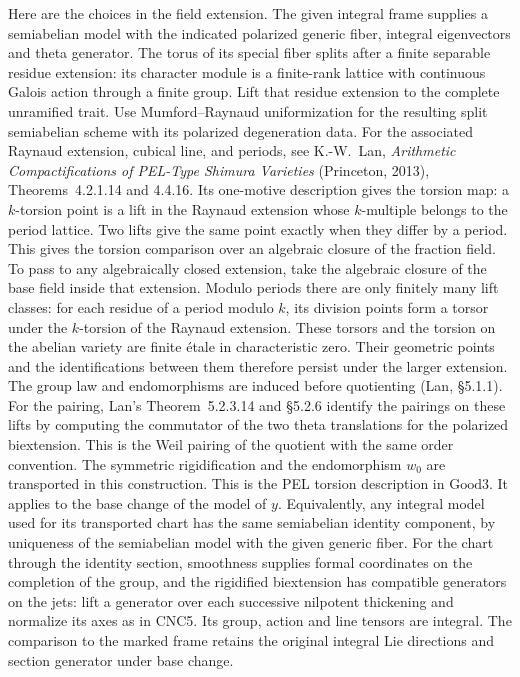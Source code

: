 Here are the choices in the field extension. The given integral frame
supplies a semiabelian model with the indicated polarized generic
fiber, integral eigenvectors and theta generator. The torus of its
special fiber splits after a finite separable residue extension:
its character module is a finite-rank lattice with continuous
Galois action through a finite group. Lift that residue extension
to the complete unramified trait. Use Mumford--Raynaud
uniformization for the resulting split semiabelian scheme with
its polarized degeneration data. For the associated Raynaud
extension, cubical line, and periods, see K.-W.~Lan,
\emph{Arithmetic Compactifications of PEL-Type Shimura Varieties}
(Princeton, 2013), Theorems~4.2.1.14 and 4.4.16. Its
one-motive description gives the torsion map: a $k$-torsion
point is a lift in the Raynaud extension whose $k$-multiple
belongs to the period lattice. Two lifts give the same point
exactly when they differ by a period. This gives the torsion
comparison over an algebraic closure of the fraction field. To
pass to any algebraically closed extension, take the algebraic
closure of the base field inside that extension. Modulo periods
there are only finitely many lift classes: for each residue of a
period modulo $k$, its division points form a torsor under the
$k$-torsion of the Raynaud extension. These torsors and the
torsion on the abelian variety are finite \'etale in characteristic
zero. Their geometric points and the identifications between them
therefore persist under the larger extension. The group law and
endomorphisms are induced before quotienting (Lan, \S5.1.1).
For the pairing, Lan's Theorem~5.2.3.14 and \S5.2.6 identify the
pairings on these lifts by computing the commutator of the two
theta translations for the polarized biextension. This is the
Weil pairing of the quotient with the same order convention.
The symmetric rigidification and
the endomorphism $w_0$ are transported in this construction.
This is the PEL torsion description in $\mathrm{Good3}$. It
applies to the base change of the model of $y$. Equivalently,
any integral model used for its transported chart has the same
semiabelian identity component, by uniqueness of the semiabelian
model with the given generic fiber. For the chart through the
identity section, smoothness supplies formal coordinates on the
completion of the group, and the rigidified biextension has
compatible generators on the jets: lift a generator over each
successive nilpotent thickening and normalize its axes as in
CNC5. Its group, action and line tensors are integral. The
comparison to the marked frame retains the original integral
Lie directions and section generator under base change.

